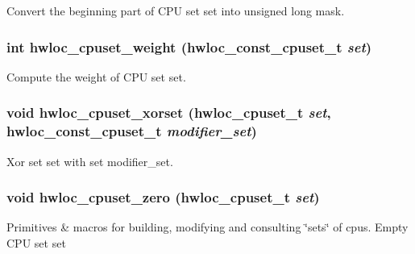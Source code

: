 Convert the beginning part of CPU set {\ttfamily set} into unsigned long {\ttfamily mask}. \hypertarget{group__hwlocality__cpuset_gad8604bd7111c2b4db14e02c16204d88d}{
\subsubsection[{hwloc\_\-cpuset\_\-weight}]{\setlength{\rightskip}{0pt plus 5cm}int hwloc\_\-cpuset\_\-weight ({\bf hwloc\_\-const\_\-cpuset\_\-t} {\em set})}}
\label{group__hwlocality__cpuset_gad8604bd7111c2b4db14e02c16204d88d}


Compute the weight of CPU set {\ttfamily set}. \hypertarget{group__hwlocality__cpuset_gaec9d3e361521741e8e67e127b2f62089}{
\subsubsection[{hwloc\_\-cpuset\_\-xorset}]{\setlength{\rightskip}{0pt plus 5cm}void hwloc\_\-cpuset\_\-xorset ({\bf hwloc\_\-cpuset\_\-t} {\em set}, \/  {\bf hwloc\_\-const\_\-cpuset\_\-t} {\em modifier\_\-set})}}
\label{group__hwlocality__cpuset_gaec9d3e361521741e8e67e127b2f62089}


Xor set {\ttfamily set} with set {\ttfamily modifier\_\-set}. \hypertarget{group__hwlocality__cpuset_ga4d63507128a35e6eda3fa6104970ac99}{
\subsubsection[{hwloc\_\-cpuset\_\-zero}]{\setlength{\rightskip}{0pt plus 5cm}void hwloc\_\-cpuset\_\-zero ({\bf hwloc\_\-cpuset\_\-t} {\em set})}}
\label{group__hwlocality__cpuset_ga4d63507128a35e6eda3fa6104970ac99}


Primitives \& macros for building, modifying and consulting \char`\"{}sets\char`\"{} of cpus. Empty CPU set {\ttfamily set} 

